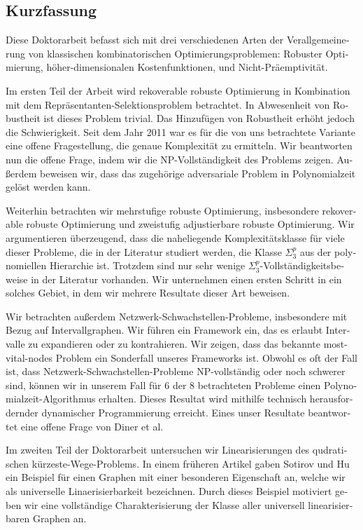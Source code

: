 \documentclass[twoside,openright,bibliography=totoc]{scrreprt}
\begin{document}
\begin{otherlanguage}{ngerman}
\chapter*{Kurzfassung}

Diese Doktorarbeit befasst sich mit drei verschiedenen Arten der Verallgemeinerung von klassischen kombinatorischen Optimierungsproblemen: Robuster Optimierung, höher-dimensionalen Kostenfunktionen, und Nicht-Präemptivität.


Im ersten Teil der Arbeit wird rekoverable robuste Optimierung in Kombination mit dem Repräsentanten-Selektionsproblem betrachtet. 
In Abwesenheit von Robustheit ist dieses Problem trivial. 
Das Hinzufügen von Robustheit erhöht jedoch die Schwierigkeit. 
Seit dem Jahr 2011 war es für die von uns betrachtete Variante eine offene Fragestellung, die genaue Komplexität zu ermitteln. Wir beantworten nun die offene Frage, indem wir die NP-Vollständigkeit des Problems zeigen.
Außerdem beweisen wir, dass das zugehörige adversariale Problem in Polynomialzeit gelöst werden kann. 

Weiterhin betrachten wir mehrstufige robuste Optimierung, insbesondere rekoverable robuste Optimierung und zweistufig adjustierbare robuste Optimierung. 
Wir argumentieren überzeugend, dass die naheliegende Komplexitätsklasse für viele dieser Probleme, die in der Literatur studiert werden, die Klasse $\Sigma^p_3$ aus der polynomiellen Hierarchie ist. Trotzdem sind nur sehr wenige $\Sigma^p_3$-Vollständigkeitsbeweise in der Literatur vorhanden. Wir unternehmen einen ersten Schritt in ein solches Gebiet, in dem wir mehrere Resultate dieser Art beweisen. 

Wir betrachten außerdem Netzwerk-Schwachstellen-Probleme, insbesondere mit Bezug auf Intervallgraphen. Wir führen ein Framework ein, das es erlaubt Intervalle zu expandieren oder zu kontrahieren. Wir zeigen, dass das bekannte most-vital-nodes Problem ein Sonderfall unseres Frameworks ist. Obwohl es oft der Fall ist, dass Netzwerk-Schwachstellen-Probleme NP-vollständig oder noch schwerer sind, können wir in unserem Fall für 6 der 8 betrachteten Probleme einen Polynomialzeit-Algorithmus erhalten. Dieses Resultat wird mithilfe technisch herausfordernder dynamischer Programmierung erreicht. Eines unser Resultate beantwortet eine offene Frage von Diner et al.


Im zweiten Teil der Doktorarbeit untersuchen wir Linearisierungen des qudratischen kürzeste-Wege-Problems. 
In einem früheren Artikel gaben Sotirov und Hu ein Beispiel für einen Graphen mit einer besonderen Eigenschaft an, welche wir als universelle Linaerisierbarkeit bezeichnen. 
Durch dieses Beispiel motiviert geben wir eine vollständige Charakterisierung der Klasse aller universell linearisierbaren Graphen an.


\end{otherlanguage}
\end{document}
